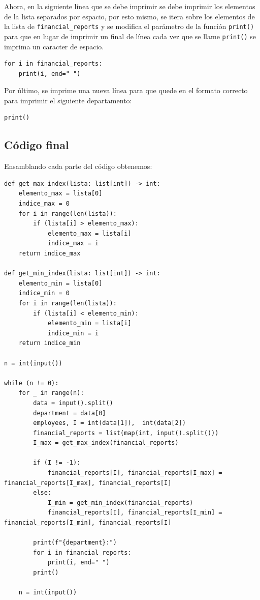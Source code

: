 \documentclass{article}
\begin{document}
Ahora, en la siguiente línea que se debe imprimir se debe imprimir los elementos de la lista separados por espacio, por esto mismo, se itera sobre los elementos de la lista de \texttt{financial\_reports} y se modifica el parámetro de la función \lstinline[style=pythonstyle]|print()| para que en lugar de imprimir un final de línea cada vez que se llame \lstinline[style=pythonstyle]|print()| se imprima un caracter de espacio.

\begin{lstlisting}[style=pythonstyle]
for i in financial_reports:
    print(i, end=" ")
\end{lstlisting}

Por último, se imprime una nueva línea para que quede en el formato correcto para imprimir el siguiente departamento:

\begin{lstlisting}[style=pythonstyle]
print()
\end{lstlisting}

\subsection{Código final}

Ensamblando cada parte del código obtenemos:


\begin{lstlisting}[style=pythonstyle]
def get_max_index(lista: list[int]) -> int:
    elemento_max = lista[0]
    indice_max = 0
    for i in range(len(lista)):
        if (lista[i] > elemento_max):
            elemento_max = lista[i]
            indice_max = i
    return indice_max

def get_min_index(lista: list[int]) -> int:
    elemento_min = lista[0]
    indice_min = 0
    for i in range(len(lista)):
        if (lista[i] < elemento_min):
            elemento_min = lista[i]
            indice_min = i
    return indice_min

n = int(input())

while (n != 0):
    for _ in range(n):
        data = input().split()
        department = data[0]
        employees, I = int(data[1]),  int(data[2])
        financial_reports = list(map(int, input().split()))
        I_max = get_max_index(financial_reports)

        if (I != -1):
            financial_reports[I], financial_reports[I_max] = financial_reports[I_max], financial_reports[I]
        else:
            I_min = get_min_index(financial_reports)
            financial_reports[I], financial_reports[I_min] = financial_reports[I_min], financial_reports[I]

        print(f"{department}:")
        for i in financial_reports:
            print(i, end=" ")
        print()

    n = int(input())
   
\end{lstlisting}



\newpage

\thispagestyle{empty}

\vspace*{0.3\textwidth}

\begin{figure}[H]
  \centering
  
\end{figure}
\end{document}
